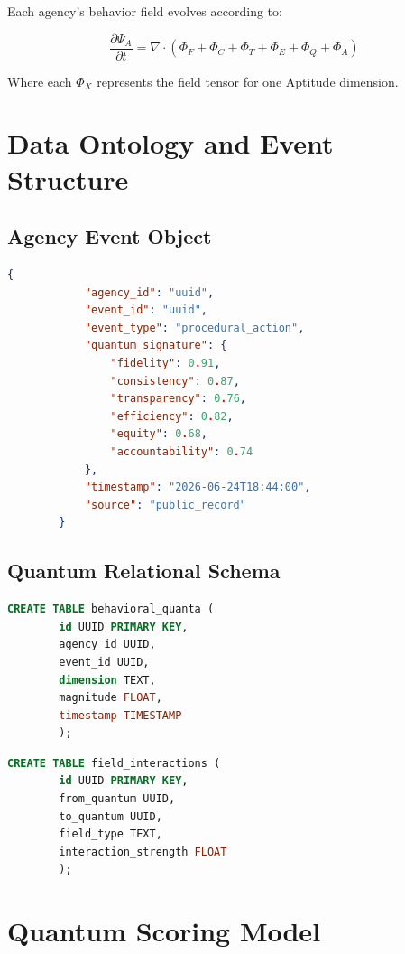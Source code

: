 \documentclass[a4paper,11pt]{article}
\begin{document}
	Each agency’s behavior field evolves according to:
	
	
	
	\[
	\frac{\partial \Psi_A}{\partial t} = \nabla \cdot (\Phi_F + \Phi_C + \Phi_T + \Phi_E + \Phi_Q + \Phi_A)
	\]
	
	
	
	Where each \(\Phi_X\) represents the field tensor for one Aptitude dimension.
	
	\section{Data Ontology and Event Structure}
	
	\subsection{Agency Event Object}
	
	\begin{lstlisting}[language=json]
		{
			"agency_id": "uuid",
			"event_id": "uuid",
			"event_type": "procedural_action",
			"quantum_signature": {
				"fidelity": 0.91,
				"consistency": 0.87,
				"transparency": 0.76,
				"efficiency": 0.82,
				"equity": 0.68,
				"accountability": 0.74
			},
			"timestamp": "2026-06-24T18:44:00",
			"source": "public_record"
		}
	\end{lstlisting}
	
	\subsection{Quantum Relational Schema}
	
	\begin{lstlisting}[language=SQL]
		CREATE TABLE behavioral_quanta (
		id UUID PRIMARY KEY,
		agency_id UUID,
		event_id UUID,
		dimension TEXT,
		magnitude FLOAT,
		timestamp TIMESTAMP
		);
	\end{lstlisting}
	
	\begin{lstlisting}[language=SQL]
		CREATE TABLE field_interactions (
		id UUID PRIMARY KEY,
		from_quantum UUID,
		to_quantum UUID,
		field_type TEXT,
		interaction_strength FLOAT
		);
	\end{lstlisting}
	
	\section{Quantum Scoring Model}
	
\end{document}
